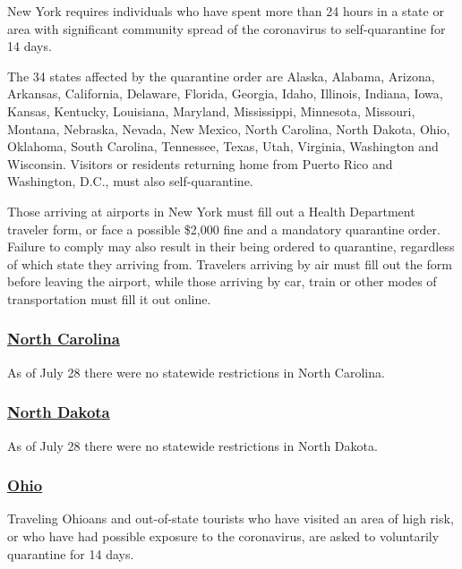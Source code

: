 New York requires individuals who have spent more than 24 hours in a
state or area with significant community spread of the coronavirus to
self-quarantine for 14 days.

The 34 states affected by the quarantine order are Alaska, Alabama,
Arizona, Arkansas, California, Delaware, Florida, Georgia, Idaho,
Illinois, Indiana, Iowa, Kansas, Kentucky, Louisiana, Maryland,
Mississippi, Minnesota, Missouri, Montana, Nebraska, Nevada, New Mexico,
North Carolina, North Dakota, Ohio, Oklahoma, South Carolina, Tennessee,
Texas, Utah, Virginia, Washington and Wisconsin. Visitors or residents
returning home from Puerto Rico and Washington, D.C., must also
self-quarantine.

Those arriving at airports in New York must fill out a Health Department
traveler form, or face a possible \$2,000 fine and a mandatory
quarantine order. Failure to comply may also result in their being
ordered to quarantine, regardless of which state they arriving from.
Travelers arriving by air must fill out the form before leaving the
airport, while those arriving by car, train or other modes of
transportation must fill it out online.

\hypertarget{north-carolina}{%
\subsubsection{\texorpdfstring{\href{https://www.nc.gov/covid-19/covid-19-travel-resources}{North
Carolina}}{North Carolina}}\label{north-carolina}}

As of July 28 there were no statewide restrictions in North Carolina.

\hypertarget{north-dakota}{%
\subsubsection{\texorpdfstring{\href{https://www.health.nd.gov/diseases-conditions/coronavirus/travel}{North
Dakota}}{North Dakota}}\label{north-dakota}}

As of July 28 there were no statewide restrictions in North Dakota.

\hypertarget{ohio}{%
\subsubsection{\texorpdfstring{\href{https://coronavirus.ohio.gov/wps/portal/gov/covid-19/home}{Ohio}}{Ohio}}\label{ohio}}

Traveling Ohioans and out-of-state tourists who have visited an area of
high risk, or who have had possible exposure to the coronavirus, are
asked to voluntarily quarantine for 14 days.

